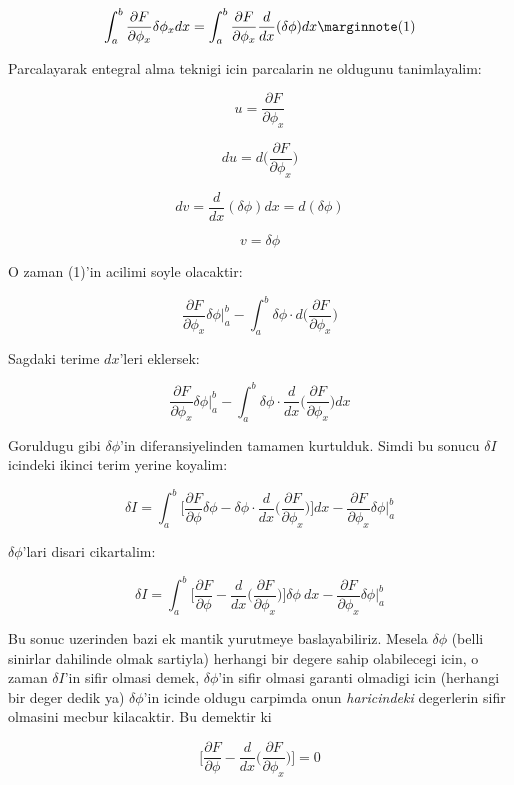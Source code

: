 \documentclass[12pt,fleqn]{article}\usepackage{../common}
\begin{document}
\begin{equation} 
\int_{a}^{b} \frac{\partial F}{\partial \phi_x}\delta\phi_x dx =
\int_{a}^{b} \frac{\partial F}{\partial \phi_x} \frac{d}{dx}(\delta \phi) dx 
\mlabel{1}
\end{equation} 

Parcalayarak entegral alma teknigi icin parcalarin ne oldugunu tanimlayalim:

\[ u = \frac{\partial F}{\partial \phi_x}  \]

\[ du  = d \bigg( \frac{\partial F}{\partial \phi_x} \bigg) \]

\[ dv  = \frac{d}{dx}(\delta \phi)dx = d(\delta \phi) \]

\[ v  = \delta \phi \]

O zaman (1)'in acilimi soyle olacaktir:

\[ 
\frac{\partial F}{\partial \phi_x} \delta \phi \bigg|_a^b - 
\int_a^b \delta \phi \cdot d \bigg( \frac{\partial F}{\partial \phi_x} \bigg)
 \]

Sagdaki terime $dx$'leri eklersek:

\[ 
\frac{\partial F}{\partial \phi_x} \delta \phi \bigg|_a^b - 
\int_a^b \delta \phi \cdot \frac{d}{dx} \bigg( \frac{\partial F}{\partial \phi_x} \bigg) dx
 \]

Goruldugu gibi $\delta \phi$'in diferansiyelinden tamamen kurtulduk. Simdi bu
sonucu $\delta I$ icindeki ikinci terim yerine koyalim:

\[ 
\delta I  = \int_{a}^{b} 
\bigg[ \frac{\partial F}{\partial \phi}\delta\phi -
\delta \phi \cdot \frac{d}{dx} \bigg( \frac{\partial F}{\partial \phi_x} \bigg)
\bigg] dx - \frac{\partial F}{\partial \phi_x} \delta \phi \bigg|_a^b 
 \]

$\delta \phi$'lari disari cikartalim:

\[ 
\delta I  = \int_{a}^{b} \bigg[
\frac{\partial F}{\partial \phi} -
\frac{d}{dx} \bigg( \frac{\partial F}{\partial \phi_x} \bigg)
\bigg] \delta\phi \ dx
- \frac{\partial F}{\partial \phi_x} \delta \phi \bigg|_a^b 
 \]

Bu sonuc uzerinden bazi ek mantik yurutmeye baslayabiliriz. Mesela $\delta \phi$
(belli sinirlar dahilinde olmak sartiyla) herhangi bir degere sahip olabilecegi
icin, o zaman $\delta I$'in sifir olmasi demek, $\delta \phi$'in sifir olmasi
garanti olmadigi icin (herhangi bir deger dedik ya) $\delta \phi$'in icinde
oldugu carpimda onun {\em haricindeki} degerlerin sifir olmasini mecbur
kilacaktir. Bu demektir ki

\[ 
\bigg[
\frac{\partial F}{\partial \phi} -
\frac{d}{dx} \bigg( \frac{\partial F}{\partial \phi_x} \bigg)
\bigg] = 0
 \]
\end{document}
